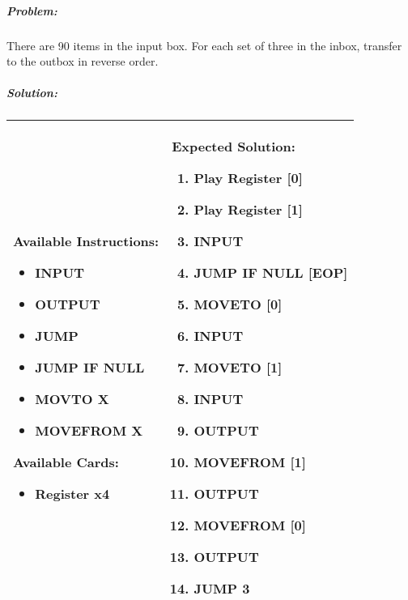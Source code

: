\subparagraph{Problem:} There are 90 items in the input box. For each set of three 
in the inbox, transfer to the outbox in reverse order.

\newpage
\subparagraph{Solution:} 
\begin{center}
    \begin{tabular}{ | m{5cm} | m{9cm} | } 
        \hline
            \textbf{Available Instructions:} 
            \begin{itemize}
                \setlength\itemsep{-.35em}
                \item INPUT
                \item OUTPUT
                \item JUMP
                \item JUMP IF NULL
                \item MOVTO X
                \item MOVEFROM X
            \end{itemize}
            \textbf{Available Cards:} 
            \begin{itemize}
                \setlength\itemsep{-.35em}
                \item Register x4
            \end{itemize}& 
            \textbf{Expected Solution:} 
            \begin{enumerate}
                \setlength\itemsep{-.35em}
                \item Play Register [0]
                \item Play Register [1]
                \item INPUT
                \item JUMP IF NULL [EOP]
                \item MOVETO [0]
                \item INPUT
                \item MOVETO [1]
                \item INPUT
                \item OUTPUT
                \item MOVEFROM [1] 
                \item OUTPUT
                \item MOVEFROM [0]
                \item OUTPUT
                \item JUMP 3
            \end{enumerate}
            \\
        \hline
    \end{tabular}
\end{center}

